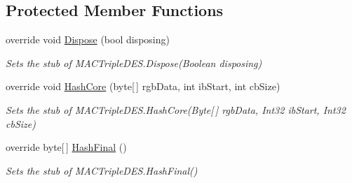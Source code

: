 \subsection*{Protected Member Functions}
\begin{DoxyCompactItemize}
\item 
override void \hyperlink{class_system_1_1_security_1_1_cryptography_1_1_fakes_1_1_stub_m_a_c_triple_d_e_s_ae477b7e32d16912684dfa1942f5a79a9}{Dispose} (bool disposing)
\begin{DoxyCompactList}\small\item\em Sets the stub of M\-A\-C\-Triple\-D\-E\-S.\-Dispose(\-Boolean disposing)\end{DoxyCompactList}\item 
override void \hyperlink{class_system_1_1_security_1_1_cryptography_1_1_fakes_1_1_stub_m_a_c_triple_d_e_s_a57f079605973dc370dc780fc72a1bec9}{Hash\-Core} (byte\mbox{[}$\,$\mbox{]} rgb\-Data, int ib\-Start, int cb\-Size)
\begin{DoxyCompactList}\small\item\em Sets the stub of M\-A\-C\-Triple\-D\-E\-S.\-Hash\-Core(\-Byte\mbox{[}$\,$\mbox{]} rgb\-Data, Int32 ib\-Start, Int32 cb\-Size)\end{DoxyCompactList}\item 
override byte\mbox{[}$\,$\mbox{]} \hyperlink{class_system_1_1_security_1_1_cryptography_1_1_fakes_1_1_stub_m_a_c_triple_d_e_s_a179ce2a3a60cb0812ed4e5bdd14b919b}{Hash\-Final} ()
\begin{DoxyCompactList}\small\item\em Sets the stub of M\-A\-C\-Triple\-D\-E\-S.\-Hash\-Final()\end{DoxyCompactList}\end{DoxyCompactItemize}
